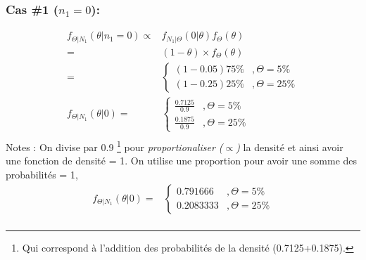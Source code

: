 \subsubsection*{Cas \#1 ($n_1 = 0$): }
\begin{align*}
f_{\Theta|N_1}(\theta| n_1 = 0) \propto & f_{N_1|\Theta}(0|\theta) f_{\Theta}(\theta) \\
= & (1 - \theta) \times  f_{\Theta}(\theta) \\
= & \left\{
     \begin{array}{rl}
      (1 - 0.05) 75\% &, \Theta = 5\% \\
      (1 - 0.25) 25\% &, \Theta = 25\%
     \end{array}
     \right. \\
f_{\Theta|N_1}(\theta|0) = & \left\{
     \begin{array}{rl}
      \frac{0.7125}{0.9} &, \Theta = 5\% \\
      \frac{0.1875}{0.9} &, \Theta = 25\%
     \end{array}
     \right. \\
\end{align*}
Notes : On divise par 0.9 \footnote{Qui correspond à l'addition des probabilités de la densité (0.7125+0.1875).} pour \emph{proportionaliser ($\propto$)} la densité et ainsi avoir une fonction de densité = 1.
On utilise une proportion pour avoir une somme des probabilités = 1,
\begin{align*}
f_{\Theta|N_1}(\theta|0) = & \left\{
     \begin{array}{rl}
      0.791666 &, \Theta = 5\% \\
      0.2083333 &, \Theta = 25\%
     \end{array}
     \right. \\
\end{align*}

